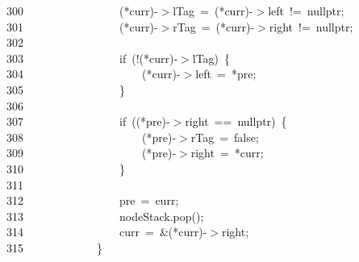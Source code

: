 \documentclass[11pt,a4paper]{ctexart}
\newcommand{\hlstd}[1]{\textcolor[rgb]{0.2,0.2,0.2}{#1}}
\newcommand{\hlopt}[1]{\textcolor[rgb]{0.2,0.2,0.2}{#1}}
\newcommand{\hllin}[1]{\textcolor[rgb]{0.59,0.59,0.59}{#1}}
\newcommand{\hlkwa}[1]{\textcolor[rgb]{0.23,0.42,0.78}{#1}}
\newcommand{\hlkwc}[1]{\textcolor[rgb]{0,0.63,0.31}{#1}}
\newcommand{\hlkwd}[1]{\textcolor[rgb]{0.78,0.23,0.41}{#1}}
\begin{document}
\hllin{300\ }\hlstd{}\hlstd{\ \ \ \ \ \ \ \ \ \ \ \ \ \ \ \ }\hlstd{}\hlopt{({*}}\hlstd{curr}\hlopt{){-}$>$}\hlstd{lTag\ }\hlopt{=\ ({*}}\hlstd{curr}\hlopt{){-}$>$}\hlstd{left\ }\hlopt{!=\ }\hlstd{}\hlkwc{nullptr}\hlstd{}\hlopt{;}\\
\hllin{301\ }\hlstd{}\hlstd{\ \ \ \ \ \ \ \ \ \ \ \ \ \ \ \ }\hlstd{}\hlopt{({*}}\hlstd{curr}\hlopt{){-}$>$}\hlstd{rTag\ }\hlopt{=\ ({*}}\hlstd{curr}\hlopt{){-}$>$}\hlstd{right\ }\hlopt{!=\ }\hlstd{}\hlkwc{nullptr}\hlstd{}\hlopt{;}\\
\hllin{302\ }\hlstd{}\\
\hllin{303\ }\hlstd{}\hlstd{\ \ \ \ \ \ \ \ \ \ \ \ \ \ \ \ }\hlstd{}\hlkwa{if\ }\hlstd{}\hlopt{(!({*}}\hlstd{curr}\hlopt{){-}$>$}\hlstd{lTag}\hlopt{)\ \{}\\
\hllin{304\ }\hlstd{}\hlstd{\ \ \ \ \ \ \ \ \ \ \ \ \ \ \ \ \ \ \ \ }\hlstd{}\hlopt{({*}}\hlstd{curr}\hlopt{){-}$>$}\hlstd{left\ }\hlopt{=\ {*}}\hlstd{pre}\hlopt{;}\\
\hllin{305\ }\hlstd{}\hlstd{\ \ \ \ \ \ \ \ \ \ \ \ \ \ \ \ }\hlstd{}\hlopt{\}}\\
\hllin{306\ }\hlstd{}\\
\hllin{307\ }\hlstd{}\hlstd{\ \ \ \ \ \ \ \ \ \ \ \ \ \ \ \ }\hlstd{}\hlkwa{if\ }\hlstd{}\hlopt{(({*}}\hlstd{pre}\hlopt{){-}$>$}\hlstd{right\ }\hlopt{==\ }\hlstd{}\hlkwc{nullptr}\hlstd{}\hlopt{)\ \{}\\
\hllin{308\ }\hlstd{}\hlstd{\ \ \ \ \ \ \ \ \ \ \ \ \ \ \ \ \ \ \ \ }\hlstd{}\hlopt{({*}}\hlstd{pre}\hlopt{){-}$>$}\hlstd{rTag\ }\hlopt{=\ }\hlstd{}\hlkwa{false}\hlstd{}\hlopt{;}\\
\hllin{309\ }\hlstd{}\hlstd{\ \ \ \ \ \ \ \ \ \ \ \ \ \ \ \ \ \ \ \ }\hlstd{}\hlopt{({*}}\hlstd{pre}\hlopt{){-}$>$}\hlstd{right\ }\hlopt{=\ {*}}\hlstd{curr}\hlopt{;}\\
\hllin{310\ }\hlstd{}\hlstd{\ \ \ \ \ \ \ \ \ \ \ \ \ \ \ \ }\hlstd{}\hlopt{\}}\\
\hllin{311\ }\hlstd{}\\
\hllin{312\ }\hlstd{}\hlstd{\ \ \ \ \ \ \ \ \ \ \ \ \ \ \ \ }\hlstd{pre\ }\hlopt{=\ }\hlstd{curr}\hlopt{;}\\
\hllin{313\ }\hlstd{}\hlstd{\ \ \ \ \ \ \ \ \ \ \ \ \ \ \ \ }\hlstd{nodeStack}\hlopt{.}\hlstd{}\hlkwd{pop}\hlstd{}\hlopt{();}\\
\hllin{314\ }\hlstd{}\hlstd{\ \ \ \ \ \ \ \ \ \ \ \ \ \ \ \ }\hlstd{curr\ }\hlopt{=\ \&({*}}\hlstd{curr}\hlopt{){-}$>$}\hlstd{right}\hlopt{;}\\
\hllin{315\ }\hlstd{}\hlstd{\ \ \ \ \ \ \ \ \ \ \ \ }\hlstd{}\hlopt{\}}\\
\end{document}
